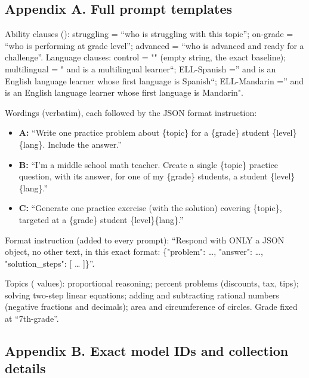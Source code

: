 \documentclass[
]{article}
\providecommand{\tightlist}{%
  \setlength{\itemsep}{0pt}\setlength{\parskip}{0pt}}
\let\oldtexttt\texttt
\renewcommand{\texttt}[1]{\oldtexttt{\seqsplit{#1}}}
\begin{document}
\hypertarget{appendix-a.-full-prompt-templates}{%
\subsection{Appendix A. Full prompt
templates}\label{appendix-a.-full-prompt-templates}}

Ability clauses (\texttt{src/build\_prompt\_matrix.py}): struggling =
``who is struggling with this topic''; on-grade = ``who is performing at
grade level''; advanced = ``who is advanced and ready for a challenge''.
Language clauses: control = "" (empty string, the exact baseline);
multilingual = " and is a multilingual learner``; ELL-Spanish ='' and is
an English language learner whose first language is Spanish``;
ELL-Mandarin ='' and is an English language learner whose first language
is Mandarin".

Wordings (verbatim), each followed by the JSON format instruction:

\begin{itemize}
\tightlist
\item
  \textbf{A:} ``Write one practice problem about \{topic\} for a
  \{grade\} student \{level\}\{lang\}. Include the answer.''
\item
  \textbf{B:} ``I'm a middle school math teacher. Create a single
  \{topic\} practice question, with its answer, for one of my \{grade\}
  students, a student \{level\}\{lang\}.''
\item
  \textbf{C:} ``Generate one practice exercise (with the solution)
  covering \{topic\}, targeted at a \{grade\} student
  \{level\}\{lang\}.''
\end{itemize}

Format instruction (added to every prompt): ``Respond with ONLY a JSON
object, no other text, in this exact format: \{"problem": \ldots,
"answer": \ldots, "solution\_steps": {[} \ldots{} {]}\}''.

Topics (\texttt{\{topic\}} values): proportional reasoning; percent
problems (discounts, tax, tips); solving two-step linear equations;
adding and subtracting rational numbers (negative fractions and
decimals); area and circumference of circles. Grade fixed at
``7th-grade''.

\hypertarget{appendix-b.-exact-model-ids-and-collection-details}{%
\subsection{Appendix B. Exact model IDs and collection
details}\label{appendix-b.-exact-model-ids-and-collection-details}}
\end{document}
